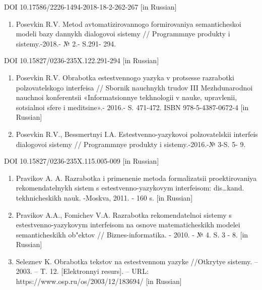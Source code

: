 DOI 10.17586/2226-1494-2018-18-2-262-267 {[}in Russian{]}

\begin{enumerate}
\def\labelenumi{\arabic{enumi}.}
\setcounter{enumi}{11}
\item
  Posevkin R.V. Metod avtomatizirovannogo formirovaniya semanticheskoi
  modeli bazy dannykh dialogovoi sistemy // Programmnye produkty i
  sistemy.-2018.- № 2.- S.291- 294.
\end{enumerate}

DOI 10.15827/0236-235X.122.291-294 {[}in Russian{]}

\begin{enumerate}
\def\labelenumi{\arabic{enumi}.}
\setcounter{enumi}{12}
\item
  Posevkin R.V. Obrabotka estestvennogo yazyka v protsesse razrabotki
  pol\textquotesingle zovatel\textquotesingle skogo interfeisa //
  Sbornik nauchnykh trudov III Mezhdunarodnoi nauchnoi konferentsii
  «Informatsionnye tekhnologii v nauke, upravlenii,
  sotsial\textquotesingle noi sfere i meditsine».- 2016.- S. 471-472.
  ISBN 978-5-4387-0672-4 {[}in Russian{]}
\item
  Posevkin R.V., Bessmertnyi I.A. Estestvenno-yazykovoi
  pol\textquotesingle zovatel\textquotesingle skii interfeis dialogovoi
  sistemy // Programmnye produkty i sistemy.-2016.-№ 3-S. 5- 9.
\end{enumerate}

DOI 10.15827/0236-235X.115.005-009 {[}in Russian{]}

\begin{enumerate}
\def\labelenumi{\arabic{enumi}.}
\setcounter{enumi}{14}
\item
  Pravikov A. A. Razrabotka i primenenie metoda formalizatsii
  proektirovaniya rekomendatel\textquotesingle nykh sistem s
  estestvenno-yazykovym interfeisom: dis\ldots kand. tekhnicheskikh
  nauk. -Moskva, 2011. - 160 s. {[}in Russian{]}
\item
  Pravikov A.A., Fomichev V.A. Razrabotka
  rekomendatel\textquotesingle noi sistemy s estestvenno-yazykovym
  interfeisom na osnove matematicheskikh modelei semanticheskikh
  ob"ektov // Biznes-informatika. - 2010. - № 4. S. 3 - 8. {[}in
  Russian{]}
\item
  Seleznev K. Obrabotka tekstov na estestvennom yazyke //Otkrytye
  sistemy. -- 2003. -- T. 12. {[}Elektronnyi resurs{]}. -- URL:
  https://www.osp.ru/os/2003/12/183694/ {[}in Russian{]}
\end{enumerate}

